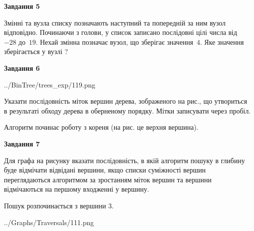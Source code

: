 \documentclass[12pt, ukrainian]{article}
\begin{document}
{\begin {large}
{\begin {center}\textbf{Завдання 5}\end {center}}\par
Змінні  та  вузла списку позначають наступний та попередній за ним вузол відповідно. Починаючи з голови, у список записано послідовні цілі числа від~$-28$ до~$19$. Нехай змінна  позначає вузол, що зберігає значення~$4$.
Яке значення зберігається у вузлі  ?\par
\newpage

{\begin {center}\textbf{Завдання 6}\end {center}}\par

\begin{center}
	{../BinTree/trees_exp/119.png}
\end{center}
Указати послідовність міток вершин дерева, зображеного на рис., що утвориться в результаті обходу дерева в оберненому порядку. Мітки записувати через пробіл.\par Алгоритм починає роботу з кореня (на рис. це верхня вершина).\par
\newpage

{\begin {center}\textbf{Завдання 7}\end {center}}\par
Для графа на рисунку вказати послідовність, в якій алгоритм пошуку в глибину буде відмічати відвідані вершини, якщо списки суміжності вершин переглядаються алгоритмом за зростанням міток вершин та вершини відмічаються на першому вход\-женні у вершину.\par
Пошук розпочинається з вершини 3.\par

\begin{center}
	{../Graphs/Traversals/111.png}
\end{center}\par
\newpage


\end{large}}
\end{document}
